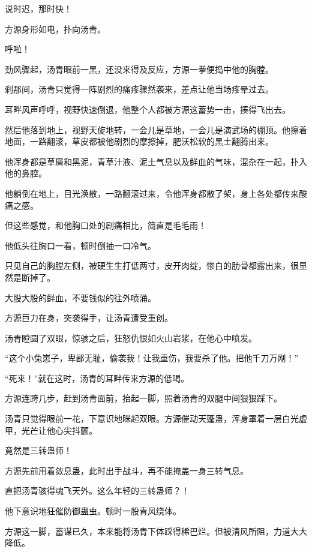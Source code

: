 
\begin{this_body}

说时迟，那时快！

方源身形如电，扑向汤青。

呼啦！

劲风骤起，汤青眼前一黑，还没来得及反应，方源一拳便捣中他的胸膛。

刹那间，汤青只觉得一阵剧烈的痛疼骤然袭来，差点让他当场疼晕过去。

耳畔风声呼呼，视野快速倒退，他整个人都被方源这蓄势一击，揍得飞出去。

然后他落到地上，视野天旋地转，一会儿是草地，一会儿是演武场的棚顶。他擦着地面，一路翻滚，草皮都被他剧烈的摩擦掉，肥沃松软的黑土翻腾出来。

他浑身都是草屑和黑泥，青草汁液、泥土气息以及鲜血的气味，混杂在一起，扑入他的鼻腔。

他躺倒在地上，目光涣散，一路翻滚过来，令他浑身都散了架，身上各处都传来酸痛之感。

但这些感觉，和他胸口处的剧痛相比，简直是毛毛雨！

他低头往胸口一看，顿时倒抽一口冷气。

只见自己的胸膛左侧，被硬生生打低两寸，皮开肉绽，惨白的肋骨都露出来，很显然是断掉了。

大股大股的鲜血，不要钱似的往外喷涌。

方源巨力在身，突袭得手，让汤青遭受重创。

汤青瞪圆了双眼，惊骇之后，狂怒仇恨如火山岩浆，在他心中喷发。

“这个小兔崽子，卑鄙无耻，偷袭我！让我重伤，我要杀了他。把他千刀万剐！”

“死来！”就在这时，汤青的耳畔传来方源的低喝。

方源连跨几步，赶到汤青面前，抬起一脚，照着汤青的双腿中间狠狠踩下。

汤青只觉得眼前一花，下意识地眯起双眼。方源催动天蓬蛊，浑身罩着一层白光虚甲，光芒让他心尖抖颤。

竟然是三转蛊师！

方源先前用着敛息蛊，此时出手战斗，再不能掩盖一身三转气息。

直把汤青骇得魂飞天外。这么年轻的三转蛊师？！

他下意识地狂催防御蛊虫。顿时一股青风绕体。

方源这一脚，蓄谋已久，本来能将汤青下体踩得稀巴烂。但被清风所阻，力道大大降低。


\end{this_body}
